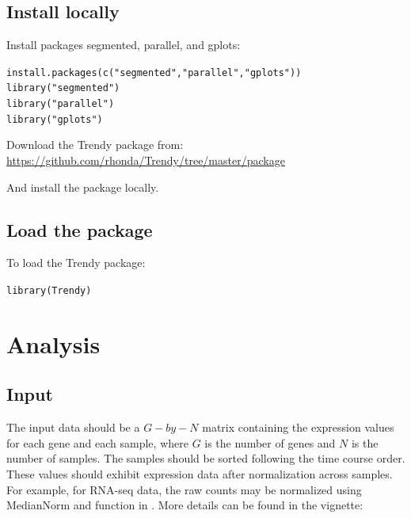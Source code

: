 \documentclass{article}\usepackage[]{graphicx}\usepackage[usenames,dvipsnames]{color}
\newcommand{\hlstr}[1]{\textcolor[rgb]{0.251,0.627,0.251}{#1}}%
\newcommand{\hlstd}[1]{\textcolor[rgb]{0.251,0.251,0.251}{#1}}%
\newcommand{\hlkwd}[1]{\textcolor[rgb]{0.878,0.439,0.125}{#1}}%
\newenvironment{knitrout}{}{} %
\begin{document}
\subsection{Install locally}

Install packages segmented, parallel, and gplots:


\begin{knitrout}
\color{fgcolor}\begin{kframe}
\begin{alltt}
\hlkwd{install.packages}\hlstd{(}\hlkwd{c}\hlstd{(}\hlstr{"segmented"}\hlstd{,}\hlstr{"parallel"}\hlstd{,}\hlstr{"gplots"}\hlstd{))}
\hlkwd{library}\hlstd{(}\hlstr{"segmented"}\hlstd{)}
\hlkwd{library}\hlstd{(}\hlstr{"parallel"}\hlstd{)}
\hlkwd{library}\hlstd{(}\hlstr{"gplots"}\hlstd{)}
\end{alltt}
\end{kframe}
\end{knitrout}

Download the Trendy package from: \url{https://github.com/rhonda/Trendy/tree/master/package}

And install the package locally.


\subsection{Load the package}

To load the Trendy package:
\begin{knitrout}
\color{fgcolor}\begin{kframe}
\begin{alltt}
\hlkwd{library}\hlstd{(Trendy)}
\end{alltt}
\end{kframe}
\end{knitrout}

\section{Analysis}

\subsection{Input}

The input data should be a $G-by-N$ matrix containing the expression values for each gene and
 each sample, where $G$ is the number of genes and $N$ is the number of samples.
The samples should be sorted following the time course order.
These values should exhibit expression data after normalization across samples.
For example, for RNA-seq data, the raw counts may be normalized using MedianNorm and
 function in . More details can be found in the  vignette:
\end{document}
